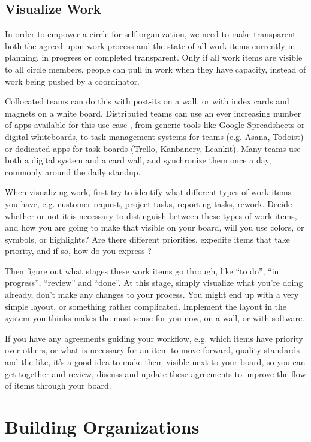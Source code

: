 \section{Visualize Work}
\label{visualizework}

In order to empower a circle for self-organization, we need to make transparent both the agreed upon work process and the state of all work items currently in planning, in progress or completed transparent. Only if all work items are visible to all circle members, people can pull in work when they have capacity, instead of work being pushed by a coordinator.

Collocated teams can do this with post-its on a wall, or with index cards and magnets on a white board. Distributed teams can use an ever increasing number of apps available for this use case , from generic tools like Google Spreadsheets or digital whiteboards, to task management systems for teams (e.g. Asana, Todoist) or dedicated apps for task boards (Trello, Kanbanery, Leankit). Many teams use both a digital system and a card wall, and synchronize them once a day, commonly around the daily standup.

When visualizing work, first try to identify what different types of work items you have, e.g. customer request, project tasks, reporting tasks, rework. Decide whether or not it is necessary to distinguish between these types of work items, and how you are going to make that visible on your board, will you use colors, or symbols, or highlights? Are there different priorities, expedite items that take priority, and if so, how do you express ?

Then figure out what stages these work items go through, like ``to do'', ``in progress'', ``review'' and ``done''. At this stage, simply visualize what you're doing already, don't make any changes to your process. You might end up with a very simple layout, or something rather complicated. Implement the layout in the system you thinks makes the most sense for you now, on a wall, or with software.

If you have any agreements guiding your workflow, e.g. which items have priority over others, or what is necessary for an item to move forward, quality standards and the like, it's a good idea to make them visible next to your board, so you can get together and review, discuss and update these agreements to improve the flow of items through your board.

\chapter{Building Organizations}
\label{buildingorganizations}

